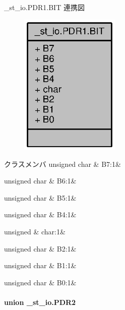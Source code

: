 \+\_\+st\+\_\+io.\+P\+D\+R1.\+B\+I\+T 連携図
\nopagebreak
\begin{figure}[H]
\begin{center}
\leavevmode
\includegraphics[width=135pt]{dc/d03/struct__st__io_8PDR1_8BIT__coll__graph}
\end{center}
\end{figure}
\begin{DoxyFields}{クラスメンバ}
unsigned char\label{3694s_8h_ad8498108dd603522047564a8da7be94c}
&
B7\+:1&
\\
\hline

unsigned char\label{3694s_8h_a68b1f1cc15d8987eafe633c9488bdc05}
&
B6\+:1&
\\
\hline

unsigned char\label{3694s_8h_a2a1ab298edf0162a3305e599b47cbeee}
&
B5\+:1&
\\
\hline

unsigned char\label{3694s_8h_ad5d4cc7b09d1843517acc9361f8f665e}
&
B4\+:1&
\\
\hline

unsigned\label{3694s_8h_aa87deb01c5f539e6bda34829c8ef2368}
&
char\+:1&
\\
\hline

unsigned char\label{3694s_8h_abbd97b00c539801e32317ab550867ec4}
&
B2\+:1&
\\
\hline

unsigned char\label{3694s_8h_ac9512565ef6194ca664dc41ec0de7a53}
&
B1\+:1&
\\
\hline

unsigned char\label{3694s_8h_a4c769c2c9989abb9fa024ab9930270e5}
&
B0\+:1&
\\
\hline

\end{DoxyFields}
\label{union__st__io_8PDR2}
\paragraph{union \+\_\+st\+\_\+io.\+P\+D\+R2}


